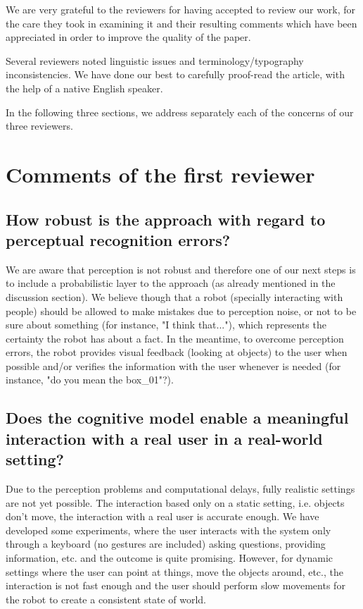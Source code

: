 \documentclass{article}
\begin{document}
We are very grateful to the reviewers for having accepted to review our 
work, for the care they took in examining it and their resulting 
comments which have been appreciated in order to improve the quality of
the paper.

Several reviewers noted linguistic issues and terminology/typography 
inconsistencies. We have done our best to carefully proof-read the article,
with the help of a native English speaker.

In the following three sections, we address separately each of
the concerns of our three reviewers.

\section{Comments of the first reviewer}

\subsection{How robust is the approach with regard to perceptual recognition
errors?}

We are aware that perception is not robust and therefore one of our next steps
is to include a probabilistic layer to the approach (as already mentioned in
the discussion section). We believe though that a robot (specially interacting
with people) should be allowed to make mistakes due to perception noise, or not
to be sure about something (for instance, "I think that..."), which represents
the certainty the robot has about a fact. In the meantime, to overcome
perception errors, the robot provides visual feedback (looking at objects) to
the user when possible and/or verifies the information with the user whenever
is needed (for instance, "do you mean the box\_01"?). 

\subsection{Does the cognitive model enable a meaningful interaction with a
real user in a real-world setting?}

Due to the perception problems and computational delays, fully realistic
settings are not yet possible.  The interaction based only on a static setting,
i.e. objects don't move, the interaction with a real user is accurate enough.
We have developed some experiments, where the user interacts with the system
only through a keyboard (no gestures are included) asking questions, providing
information, etc. and the outcome is quite promising. However, for dynamic
settings where the user can point at things, move the objects around, etc., the
interaction is not fast enough and the user should perform slow movements for
the robot to create a consistent state of world.
\end{document}

